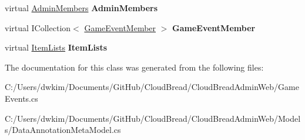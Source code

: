 \begin{DoxyCompactItemize}
\item 
virtual \hyperlink{class_cloud_bread_admin_web_1_1_admin_members}{Admin\+Members} {\bfseries Admin\+Members}\hypertarget{class_cloud_bread_admin_web_1_1_game_events_a14704d01ea7e984a12f19cd12c85b9cf}{}\label{class_cloud_bread_admin_web_1_1_game_events_a14704d01ea7e984a12f19cd12c85b9cf}

\item 
virtual I\+Collection$<$ \hyperlink{class_cloud_bread_admin_web_1_1_game_event_member}{Game\+Event\+Member} $>$ {\bfseries Game\+Event\+Member}\hypertarget{class_cloud_bread_admin_web_1_1_game_events_ae10ac9975db38c804f7b73c553f20347}{}\label{class_cloud_bread_admin_web_1_1_game_events_ae10ac9975db38c804f7b73c553f20347}

\item 
virtual \hyperlink{class_cloud_bread_admin_web_1_1_item_lists}{Item\+Lists} {\bfseries Item\+Lists}\hypertarget{class_cloud_bread_admin_web_1_1_game_events_af9f89517a0504a7bf3d4647dc27b13cd}{}\label{class_cloud_bread_admin_web_1_1_game_events_af9f89517a0504a7bf3d4647dc27b13cd}

\end{DoxyCompactItemize}


The documentation for this class was generated from the following files\+:\begin{DoxyCompactItemize}
\item 
C\+:/\+Users/dwkim/\+Documents/\+Git\+Hub/\+Cloud\+Bread/\+Cloud\+Bread\+Admin\+Web/Game\+Events.\+cs\item 
C\+:/\+Users/dwkim/\+Documents/\+Git\+Hub/\+Cloud\+Bread/\+Cloud\+Bread\+Admin\+Web/\+Models/Data\+Annotation\+Meta\+Model.\+cs\end{DoxyCompactItemize}
